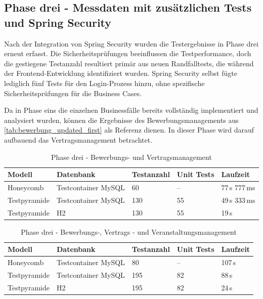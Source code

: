 \subsection{Phase drei - Messdaten mit zusätzlichen Tests und Spring Security}
Nach der Integration von Spring Security wurden die Testergebnisse in Phase drei erneut erfasst. Die Sicherheitsprüfungen beeinflussen die Testperformance, doch die gestiegene Testanzahl resultiert primär aus neuen Randfalltests, die während der Frontend-Entwicklung identifiziert wurden. Spring Security selbst fügte lediglich fünf Tests für den Login-Prozess hinzu, ohne spezifische Sicherheitsprüfungen für die Business Cases.

Da in Phase eins die einzelnen Businessfälle bereits vollständig implementiert und analysiert wurden, können die Ergebnisse des Bewerbungsmanagements aus \autoref{tab:bewerbung_updated_first} als Referenz dienen. In dieser Phase wird darauf aufbauend das Vertragsmanagement betrachtet.

\begin{table}[H]
	\centering
	\begin{tabular}{|l|l|l|l|l|}
		\hline
		\textbf{Modell} & \textbf{Datenbank} & \textbf{Testanzahl} & \textbf{Unit Tests} & \textbf{Laufzeit} \\
		\hline
		Honeycomb       & Testcontainer MySQL & 60  & --  & 77\,s 777\,ms   \\
		\hline
		Testpyramide    & Testcontainer MySQL & 130  & 55  & 49\,s 333\,ms    \\
		\hline
		Testpyramide    & H2                  & 130  & 55  & 19\,s \\
		\hline
	\end{tabular}
	\caption{Phase drei - Bewerbungs- und Vertragsmanagement}
	\label{tab:bewerbung_mit_vertrag_updated}
\end{table}


\begin{table}[H]
	\centering
	\begin{tabular}{|l|l|l|l|l|}
		\hline
		\textbf{Modell} & \textbf{Datenbank} & \textbf{Testanzahl} & \textbf{Unit Tests} & \textbf{Laufzeit} \\
		\hline
		Honeycomb      & Testcontainer MySQL & 80  & --  & 107\,s \\
		\hline
		Testpyramide   & Testcontainer MySQL & 195 & 82  & 88\,s    \\
		\hline
		Testpyramide   & H2                  & 195 & 82  & 24\,s   \\
		\hline
	\end{tabular}
		\caption{Phase drei - Bewerbungs-, Vertrags - und Veranstaltungsmanagement}
		\label{tab:eventbereich_updated}
\end{table}

